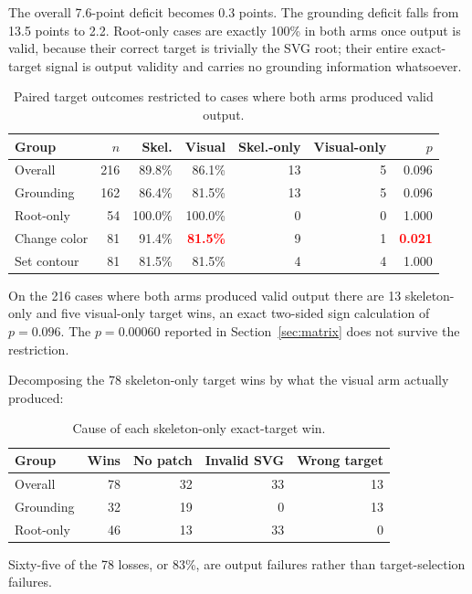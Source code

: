 \documentclass[10pt,a4paper]{article}
\newcommand{\bad}[1]{\textcolor{red}{\textbf{#1}}}
\begin{document}
The overall 7.6-point deficit becomes 0.3 points. The grounding deficit falls
from 13.5 points to 2.2. Root-only cases are exactly 100\% in both arms once
output is valid, because their correct target is trivially the SVG root; their
entire exact-target signal is output validity and carries no grounding
information whatsoever.

\begin{table}[H]
\centering
\caption{Paired target outcomes restricted to cases where both arms produced
valid output.}
\begin{tabular}{@{}lrrrrrr@{}}
\toprule
\textbf{Group} & \textbf{\(n\)} & \textbf{Skel.} & \textbf{Visual} &
\textbf{Skel.-only} & \textbf{Visual-only} & \textbf{\(p\)}\\
\midrule
Overall & 216 & 89.8\% & 86.1\% & 13 & 5 & 0.096\\
Grounding & 162 & 86.4\% & 81.5\% & 13 & 5 & 0.096\\
Root-only & 54 & 100.0\% & 100.0\% & 0 & 0 & 1.000\\
\addlinespace
\quad Change color & 81 & 91.4\% & \bad{81.5\%} & 9 & 1 & \bad{0.021}\\
\quad Set contour & 81 & 81.5\% & 81.5\% & 4 & 4 & 1.000\\
\bottomrule
\end{tabular}
\end{table}

On the 216 cases where both arms produced valid output there are 13
skeleton-only and five visual-only target wins, an exact two-sided sign
calculation of \(p=0.096\). The \(p=0.00060\) reported in
Section~\ref{sec:matrix} does not survive the restriction.

Decomposing the 78 skeleton-only target wins by what the visual arm actually
produced:

\begin{table}[H]
\centering
\caption{Cause of each skeleton-only exact-target win.}
\begin{tabular}{@{}lrrrr@{}}
\toprule
\textbf{Group} & \textbf{Wins} & \textbf{No patch} &
\textbf{Invalid SVG} & \textbf{Wrong target}\\
\midrule
Overall & 78 & 32 & 33 & 13\\
Grounding & 32 & 19 & 0 & 13\\
Root-only & 46 & 13 & 33 & 0\\
\bottomrule
\end{tabular}
\end{table}

Sixty-five of the 78 losses, or 83\%, are output failures rather than
target-selection failures.
\end{document}
